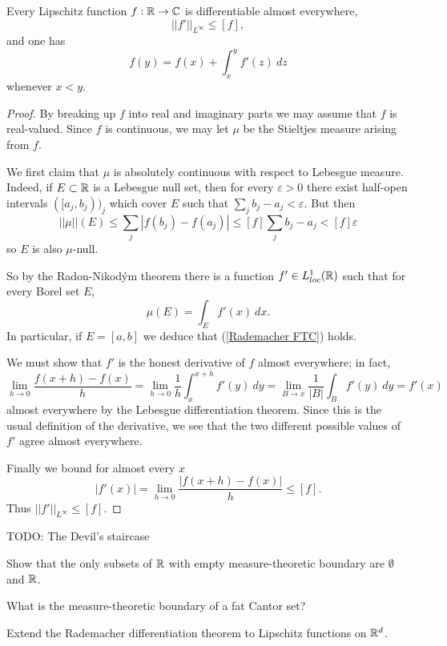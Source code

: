 \begin{theorem}
Every Lipschitz function $f: \mathbb{R} \to \mathbb{C}$ is differentiable almost everywhere,
$$||f'||_{L^\infty} \leq [f],$$
and one has
\begin{equation}\label{Rademacher FTC}
f(y) = f(x) + \int_x^y f'(z) ~dz
\end{equation}
whenever $x < y$.
\end{theorem}
\begin{proof}
By breaking up $f$ into real and imaginary parts we may assume that $f$ is real-valued.
Since $f$ is continuous, we may let $\mu$ be the Stieltjes measure arising from $f$.

We first claim that $\mu$ is absolutely continuous with respect to Lebesgue measure.
Indeed, if $E \subset \mathbb{R}$ is a Lebesgue null set, then for every $\varepsilon > 0$ there exist half-open intervals $([a_j, b_j))_j$ which cover $E$ such that $\sum_j b_j - a_j < \varepsilon$.
But then
$$||\mu||(E) \leq \sum_j |f(b_j) - f(a_j)| \leq [f] \sum_j b_j - a_j < [f]\varepsilon$$
so $E$ is also $\mu$-null.

So by the Radon-Nikod\'ym theorem there is a function $f' \in L^1_{loc}(\mathbb{R})$ such that for every Borel set $E$,
$$\mu(E) = \int_E f'(x) ~dx.$$
In particular, if $E = [a, b]$ we deduce that (\ref{Rademacher FTC}) holds.

We must show that $f'$ is the honest derivative of $f$ almost everywhere; in fact,
$$\lim_{h \to 0} \frac{f(x + h) - f(x)}{h} = \lim_{h \to 0} \frac{1}{h} \int_{x}^{x + h} f'(y) ~dy = \lim_{B \to x} \frac{1}{|B|} \int_B f'(y) ~dy = f'(x)$$
almost everywhere by the Lebesgue differentiation theorem.
Since this is the usual definition of the derivative, we see that the two different possible values of $f'$ agree almost everywhere.

Finally we bound for almost every $x$
$$|f'(x)| = \lim_{h \to 0} \frac{|f(x + h) - f(x)|}{h} \leq [f].$$
Thus $||f'||_{L^\infty} \leq [f]$.
\end{proof}

TODO: The Devil's staircase

\begin{exercise}
Show that the only subsets of $\mathbb{R}$ with empty measure-theoretic boundary are $\emptyset$ and $\mathbb{R}$.
\end{exercise}

\begin{exercise}
What is the measure-theoretic boundary of a fat Cantor set?
\end{exercise}

\begin{exercise}
Extend the Rademacher differentiation theorem to Lipschitz functions on $\mathbb{R}^d$.
\end{exercise}
